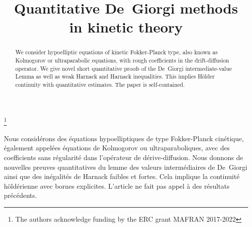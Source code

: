 \documentclass[JEP,XML,SOM,Unicode,NoFloatCountersInSection,published]{cedram}
\theoremstyle{definition}
\theoremstyle{remark}
\begin{document}
\title[Quantitative De~Giorgi methods in kinetic
theory]{Quantitative De~Giorgi methods\\ in kinetic theory}

\author[\initial{J.} \lastname{Guerand}]{ }
\address{Université de Montpellier, IMAG\\
499-554 rue du Truel, 34090 Montpellier, France}

\author[\initial{C.} \lastname{Mouhot}]{ }
\address{University of Cambridge, Department of
Pure Mathematics and Mathematical Statistics\\
Wilberforce Road,
Cambridge CB3 0WA, United Kingdom}

\thanks{The authors acknowledge funding by the ERC grant MAFRAN 2017-2022}

\begin{abstract}
We consider hypoelliptic equations of kinetic Fokker-Planck type, also known as Kolmogorov or ultraparabolic equations, with rough coefficients in the drift-diffusion operator. We give novel short quantitative proofs of the De~Giorgi intermediate-value Lemma as well as weak Harnack and Harnack inequalities. This implies Hölder continuity with quantitative estimates. The paper is self-contained.
\end{abstract}





\begin{altabstract}
Nous considérons des équations hypoelliptiques de type Fokker-Planck cinétique, également appelées équations de Kolmogorov ou ultraparaboliques, avec des coefficients sans régularité dans l'opérateur de dérive-diffusion. Nous donnons de nouvelles preuves quantitatives du lemme des valeurs inter\-médiaires de De~Giorgi ainsi que des inégalités de Harnack faibles et fortes. Cela implique la continuité höldérienne avec bornes explicites. L'article ne fait pas appel à des résultats précédents.\end{altabstract}
\end{document}

